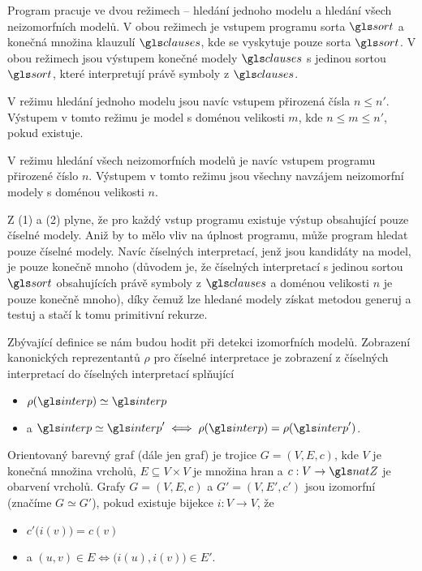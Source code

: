 \begin{defn}
Program pracuje ve dvou režimech -- hledání jednoho modelu a
hledání všech neizomorfních modelů. V obou režimech je vstupem programu
sorta $\sort$ a konečná množina klauzulí $\clauses$,
kde se vyskytuje pouze sorta $\sort$.
V obou režimech jsou výstupem konečné modely $\clauses$
s jedinou sortou $\sort$, které
interpretují právě symboly z $\clauses$.

V režimu hledání jednoho modelu jsou navíc vstupem přirozená čísla
$n \leq n'$. Výstupem v tomto režimu je model
s doménou velikosti $m$, kde $n \leq m \leq n'$, pokud existuje.

V režimu hledání všech neizomorfních modelů je
navíc vstupem programu přirozené číslo $n$.
Výstupem v tomto režimu jsou všechny navzájem
neizomorfní modely s doménou velikosti $n$.
\end{defn}

Z (1) a (2) plyne, že pro každý vstup programu existuje výstup
obsahující pouze číselné modely. Aniž by to mělo vliv na úplnost
programu, může program hledat pouze číselné modely.
Navíc číselných interpretací, jenž jsou kandidáty na model,
je pouze konečně mnoho (důvodem je, že
číselných interpretací s jedinou sortou $\sort$ obsahujících právě symboly
z $\clauses$ a doménou velikosti $n$ je pouze konečně mnoho),
díky čemuž lze hledané
modely získat metodou generuj a testuj a stačí k tomu primitivní rekurze.

Zbývající definice se nám budou hodit při detekci izomorfních modelů.
Zobrazení kanonických reprezentantů $\rho$ pro číselné interpretace
je zobrazení z číselných interpretací do číselných interpretací splňující
\begin{itemize}
\item $\rho(\interp) \simeq \interp$
\item a $\interp \simeq \interp' \iff \rho(\interp) = \rho(\interp')$.
\end{itemize}

Orientovaný barevný graf (dále jen graf) je trojice $G = (V, E, c)$, kde
$V$ je konečná množina vrcholů, $E \subseteq V \times V$ je množina hran
a $c : V \to \natZ$ je obarvení vrcholů. Grafy
$G = (V, E, c)$ a $G' = (V, E', c')$ jsou izomorfní (značíme $G \simeq G'$),
pokud existuje bijekce $i : V \to V$, že
\begin{itemize}
\item $c'\bigl(i(v)\bigr) = c(v)$
\item a $(u, v) \in E \iff \bigl(i(u), i(v)\bigr) \in E'$.
\end{itemize}

